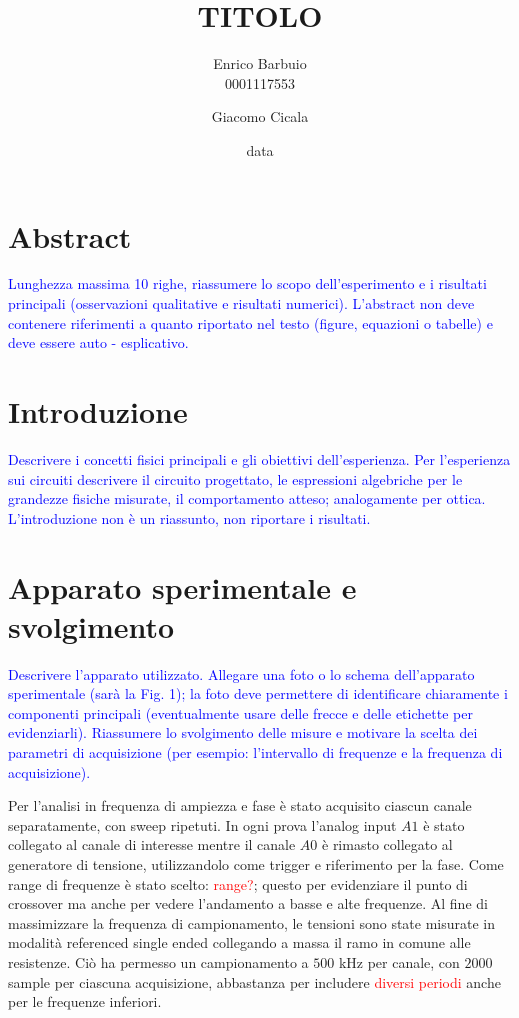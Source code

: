 \documentclass[12pt,italian]{article}
\title{TITOLO}
\author{Enrico Barbuio \\ 0001117553 \and Giacomo Cicala}
\date{data}
\newcommand{\prof}[1]{\textcolor{blue}{#1}}
\newcommand{\err}[1]{\textcolor{red}{#1}}
\begin{document}
\maketitle
\section*{Abstract}
\prof{ Lunghezza massima 10 righe, riassumere lo scopo dell'esperimento e i
  risultati principali (osservazioni qualitative e risultati numerici).
  L'abstract non deve contenere riferimenti a quanto riportato nel testo
  (figure, equazioni o tabelle) e deve essere auto - esplicativo. }

\section*{Introduzione}
\prof{ Descrivere i concetti fisici principali e gli obiettivi dell'esperienza.
  Per l'esperienza sui circuiti descrivere il circuito progettato, le
  espressioni algebriche per le grandezze fisiche misurate, il comportamento
  atteso; analogamente per ottica. L'introduzione non è un riassunto, non
  riportare i risultati. }

\section*{Apparato sperimentale e svolgimento}
\prof{ Descrivere l'apparato utilizzato. Allegare una foto o lo schema
  dell'apparato sperimentale (sarà la Fig. 1); la foto deve permettere di
  identificare chiaramente i componenti principali (eventualmente usare delle
  frecce e delle etichette per evidenziarli). Riassumere lo svolgimento delle
  misure e motivare la scelta dei parametri di acquisizione (per esempio:
  l'intervallo di frequenze e la frequenza di acquisizione). }

Per l'analisi in frequenza di ampiezza e fase è stato acquisito ciascun canale
separatamente, con sweep ripetuti. In ogni prova l'analog input $A1$ è stato
collegato al canale di interesse mentre il canale $A0$ è rimasto collegato al
generatore di tensione, utilizzandolo come trigger e riferimento per la fase.
Come range di frequenze è stato scelto: \err{range?}; questo per evidenziare il
punto di crossover ma anche per vedere l'andamento a basse e alte frequenze. Al
fine di massimizzare la frequenza di campionamento, le tensioni sono state
misurate in modalità referenced single ended collegando a massa il ramo in
comune alle resistenze. Ciò ha permesso un campionamento a $500$ kHz per
canale, con $2000$ sample per ciascuna acquisizione, abbastanza per includere
\err{diversi periodi} anche per le frequenze inferiori.
\end{document}
